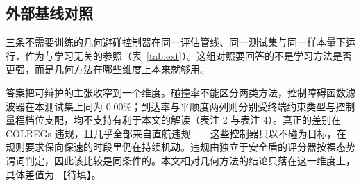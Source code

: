 \documentclass[12pt,letterpaper]{article}
\newcommand{\TBD}{【待填】}
\begin{document}
\subsection{外部基线对照}
\label{sec:res-ext}

三条不需要训练的几何避碰控制器在同一评估管线、同一测试集与同一样本量下运行，作为与学习无关的参照（表~\ref{tab:ext}）。这组对照要回答的不是学习方法是否更强，而是几何方法在哪些维度上本来就够用。

答案把可辩护的主张收窄到一个维度。碰撞率不能区分两类方法，控制障碍函数滤波器在本测试集上同为 $0.00\%$；到达率与平顺度两列则分别受终端约束类型与控制量程档位支配，均不支持有利于本文的解读（表注 2 与表注 4）。真正的差别在 COLREGs 违规，且几乎全部来自直航违规——这些控制器只以不碰为目标，在规则要求保向保速的时段里仍在持续机动。违规由独立于安全盾的评分器按裸态势谓词判定，因此该比较是同条件的。本文相对几何方法的结论只落在这一维度上，具体差值为 \TBD。
\end{document}
